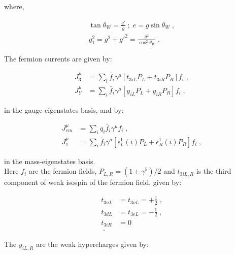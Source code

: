 \noindent where,

 \begin{equation}
 \begin{split}
  \tan \theta_{W} = \frac{g\prime}{g} \; ; \;  e = g \sin \theta_{W} \; , \\
    g_{1}^{2} = g^{2} + g\prime^{2} = \frac{g^{2}}{\cos ^{2} \theta_{W}} \; .
 \end{split}
 \end{equation}

\noindent The fermion currents are given by:

\begin{equation}
\begin{split}
 J_{3}^{\mu} &= \sum_{i} \bar{f}_{i} \gamma^{\mu} \left[t_{3iL} P_{L} + t_{3iR} P_{R} \right] f_{i} \; , \\
 J_{Y}^{\mu} &= \sum_{i} \bar{f}_{i} \gamma^{\mu} \left[y_{iL} P_{L} + y_{iR} P_{R} \right] f_{i} \; ,
\end{split}
\end{equation}

\noindent in the gauge-eigenstates basis, and by:

\begin{equation}
\begin{split}
 J_{em}^{\mu} &= \sum_{i} q_{i} \bar{f}_{i} \gamma^{\mu} f_{i}  \; , \\
 J_{1}^{\mu} &= \sum_{i} \bar{f}_{i} \gamma^{\mu} \left[\epsilon_{L}^{1}(i) P_{L} + \epsilon_{R}^{1}(i) P_{R} \right] f_{i} \; , 
\end{split}
\end{equation}

\noindent in the mass-eigenstates basis.\\

\noindent Here $f_{i}$ are the fermion fields, $P_{L,R}= (1 \pm \gamma^{5})/2$ and $t_{3iL,R}$ is the third component
of weak isospin of the fermion field, given by:

 \begin{equation}
 \begin{split}
 t_{3u L} &= t_{3\nu L} = +\frac{1}{2}  \; ,  \\
 t_{3d L} &= t_{3 e L} = -\frac{1}{2}   \; ,   \\
 t_{3iR} &= 0 \\  \; .
 \end{split}
 \end{equation}

 \noindent The $y_{iL,R}$ are the weak hypercharges given by:
 
